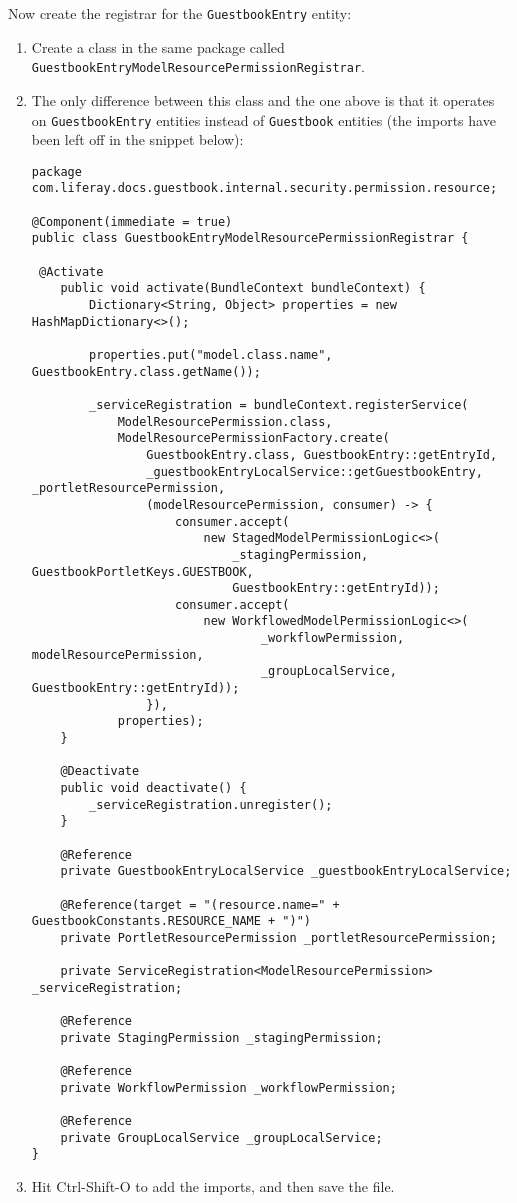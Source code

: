 Now create the registrar for the \texttt{GuestbookEntry} entity:

\begin{enumerate}
\def\labelenumi{\arabic{enumi}.}
\item
  Create a class in the same package called
  \texttt{GuestbookEntryModelResourcePermissionRegistrar}.
\item
  The only difference between this class and the one above is that it
  operates on \texttt{GuestbookEntry} entities instead of
  \texttt{Guestbook} entities (the imports have been left off in the
  snippet below):

\begin{verbatim}
package com.liferay.docs.guestbook.internal.security.permission.resource;

@Component(immediate = true)
public class GuestbookEntryModelResourcePermissionRegistrar {

 @Activate
    public void activate(BundleContext bundleContext) {
        Dictionary<String, Object> properties = new HashMapDictionary<>();

        properties.put("model.class.name", GuestbookEntry.class.getName());

        _serviceRegistration = bundleContext.registerService(
            ModelResourcePermission.class,
            ModelResourcePermissionFactory.create(
                GuestbookEntry.class, GuestbookEntry::getEntryId,
                _guestbookEntryLocalService::getGuestbookEntry, _portletResourcePermission,
                (modelResourcePermission, consumer) -> {
                    consumer.accept(
                        new StagedModelPermissionLogic<>(
                            _stagingPermission, GuestbookPortletKeys.GUESTBOOK,
                            GuestbookEntry::getEntryId));
                    consumer.accept(
                        new WorkflowedModelPermissionLogic<>(
                                _workflowPermission, modelResourcePermission,
                                _groupLocalService, GuestbookEntry::getEntryId));
                }),
            properties);
    }

    @Deactivate
    public void deactivate() {
        _serviceRegistration.unregister();
    }

    @Reference
    private GuestbookEntryLocalService _guestbookEntryLocalService;

    @Reference(target = "(resource.name=" + GuestbookConstants.RESOURCE_NAME + ")")
    private PortletResourcePermission _portletResourcePermission;

    private ServiceRegistration<ModelResourcePermission> _serviceRegistration;

    @Reference
    private StagingPermission _stagingPermission;

    @Reference
    private WorkflowPermission _workflowPermission;

    @Reference
    private GroupLocalService _groupLocalService;
}
\end{verbatim}
\item
  Hit Ctrl-Shift-O to add the imports, and then save the file.
\end{enumerate}

